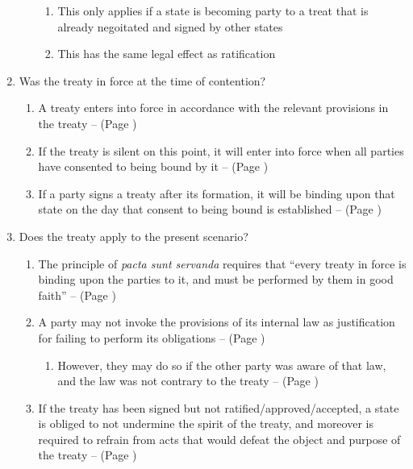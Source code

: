 \begin{enumerate}
\begin{enumerate}
\begin{enumerate}
            \item This only applies if a state is becoming party to a treat that is already negoitated and signed by other states
            \item This has the same legal effect as ratification
        \end{enumerate}
    \end{enumerate}
    \item Was the treaty in force at the time of contention?
    \begin{enumerate}
        \item A treaty enters into force in accordance with the relevant provisions in the treaty --  (Page \pageref{VCLT Art 24})
        \item If the treaty is silent on this point, it will enter into force when all parties have consented to being bound by it --  (Page \pageref{VCLT Art 24})
        \item If a party signs a treaty after its formation, it will be binding upon that state on the day that consent to being bound is established --  (Page \pageref{VCLT Art 24})
    \end{enumerate}
    \item Does the treaty apply to the present scenario?
    \begin{enumerate}
        \item The principle of \textit{pacta sunt servanda} requires that ``every treaty in force is binding upon the parties to it, and must be performed by them in good faith'' --  (Page \pageref{VCLT Art 26})
        \item A party may not invoke the provisions of its internal law as justification for failing to perform its obligations --  (Page \pageref{VCLT Art 27})
        \begin{enumerate}
            \item However, they may do so if the other party was aware of that law, and the law was not contrary to the treaty --  (Page \pageref{VCLT Art 46})
        \end{enumerate}
        \item If the treaty has been signed but not ratified/approved/accepted, a state is obliged to not undermine the spirit of the treaty, and moreover is required to refrain from acts that would defeat the object and purpose of the treaty --  (Page \pageref{VCLT Art 18})

\end{enumerate}
\end{enumerate}
